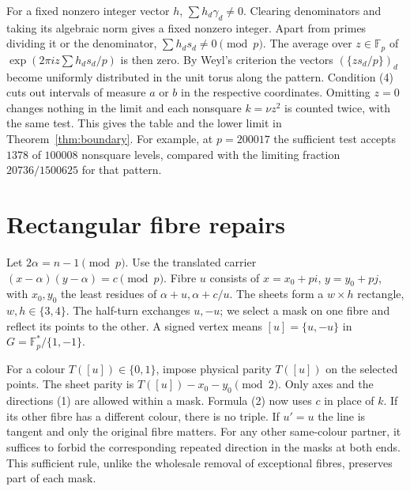 \documentclass[11pt]{article}
\newcommand{\F}{\mathbb F_p}\newcommand{\Z}{\mathbb Z}\newcommand{\B}{\mathcal B}\newcommand{\D}{\mathcal D}\newcommand{\A}{\mathcal A}\newcommand{\ch}{\chi}\newcommand{\eps}{\varepsilon}
\begin{document}
For a fixed nonzero integer vector $h$, $\sum h_d\gamma_d\ne0$. Clearing denominators and taking its algebraic norm gives a fixed nonzero integer. Apart from primes dividing it or the denominator, $\sum h_d s_d\ne0\pmod p$. The average over $z\in\F$ of $\exp(2\pi i z\sum h_ds_d/p)$ is then zero. By Weyl's criterion the vectors $(\{z s_d/p\})_d$ become uniformly distributed in the unit torus along the pattern. Condition (4) cuts out intervals of measure $a$ or $b$ in the respective coordinates. Omitting $z=0$ changes nothing in the limit and each nonsquare $k=\nu z^2$ is counted twice, with the same test. This gives the table and the lower limit in Theorem~\ref{thm:boundary}. For example, at $p=200017$ the sufficient test accepts $1378$ of $100008$ nonsquare levels, compared with the limiting fraction $20736/1500625$ for that pattern.

\section{Rectangular fibre repairs}
Let $2\alpha=n-1\pmod p$. Use the translated carrier $(x-\alpha)(y-\alpha)=c\pmod p$. Fibre $u$ consists of $x=x_0+pi$, $y=y_0+pj$, with $x_0,y_0$ the least residues of $\alpha+u,\alpha+c/u$. The sheets form a $w\times h$ rectangle, $w,h\in\{3,4\}$. The half-turn exchanges $u,-u$; we select a mask on one fibre and reflect its points to the other. A signed vertex means $[u]=\{u,-u\}$ in $G=\F^*/\{1,-1\}$.

For a colour $T([u])\in\{0,1\}$, impose physical parity $T([u])$ on the selected points. The sheet parity is $T([u])-x_0-y_0\pmod2$. Only axes and the directions (1) are allowed within a mask. Formula (2) now uses $c$ in place of $k$. If its other fibre has a different colour, there is no triple. If $u'=u$ the line is tangent and only the original fibre matters. For any other same-colour partner, it suffices to forbid the corresponding repeated direction in the masks at both ends. This sufficient rule, unlike the wholesale removal of exceptional fibres, preserves part of each mask.
\end{document}
